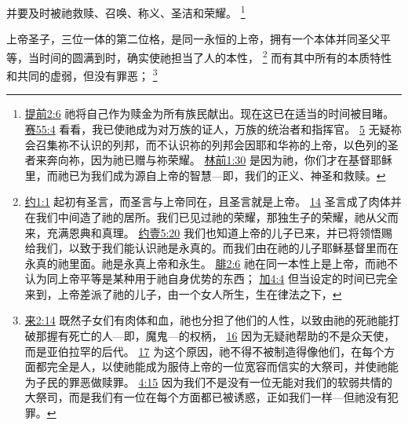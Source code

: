 \documentclass[12pt, a4paper, oneside]{ctexart}
\newcounter{parnum}[section]
\newcommand{\N}{%
   \noindent\refstepcounter{parnum}%
    \makebox[\parindent][l]{\textbf{\arabic{parnum}.}}}
\begin{document}
	并要及时被祂救赎、召唤、称义、圣洁和荣耀。
	\footnote {
		\href{https://biblehub.com/1_timothy/2-6.htm}{提前2:6} 祂将自己作为赎金为所有族民献出。现在这已在适当的时间被目睹。
		\href{https://biblehub.com/isaiah/55-4.htm}{赛55:4} 看看，我已使祂成为对万族的证人，万族的统治者和指挥官。
        \href{https://biblehub.com/isaiah/55-5.htm}{5} 无疑祢会召集祢不认识的列邦，而不认识祢的列邦会因耶和华祢的上帝，以色列的圣者来奔向祢，因为祂已赠与祢荣耀。
		\href{https://biblehub.com/1_corinthians/1-30.htm}{林前1:30} 是因为祂，你们才在基督耶稣里，而祂已为我们成为源自上帝的智慧---即，我们的正义、神圣和救赎。
	}

\N 上帝圣子，三位一体的第二位格，是同一永恒的上帝，拥有一个本体并同圣父平等，当时间的圆满到时，确实使祂担当了人的本性，
	\footnote {
		\href{https://biblehub.com/john/1-1.htm}{约1:1} 起初有圣言，而圣言与上帝同在，且圣言就是上帝。
		\href{https://biblehub.com/john/1-14.htm}{14} 圣言成了肉体并在我们中间造了祂的居所。我们已见过祂的荣耀，那独生子的荣耀，祂从父而来，充满恩典和真理。
		\href{https://biblehub.com/1_john/5-20.htm}{约壹5:20} 我们也知道上帝的儿子已来，并已将领悟赐给我们，以致于我们能认识祂是永真的。而我们由在祂的儿子耶稣基督里而在永真的祂里面。祂是永真上帝和永生。
		\href{https://biblehub.com/philippians/2-6.htm}{腓2:6} 祂在同一本性上是上帝，而祂不认为同上帝平等是某种用于祂自身优势的东西；
		\href{https://biblehub.com/galatians/4-4.htm}{加4:4} 但当设定的时间已完全来到，上帝差派了祂的儿子，由一个女人所生，生在律法之下，
	}
	而有其中所有的本质特性和共同的虚弱，但没有罪恶；
	\footnote {
		\href{https://biblehub.com/hebrews/2-14.htm}{来2:14} 既然子女们有肉体和血，祂也分担了他们的人性，以致由祂的死祂能打破那握有死亡的人---即，魔鬼---的权柄，
		\href{https://biblehub.com/hebrews/2-16.htm}{16} 因为无疑祂帮助的不是众天使，而是亚伯拉罕的后代。
		\href{https://biblehub.com/hebrews/2-17.htm}{17} 为这个原因，祂不得不被制造得像他们，在每个方面都完全是人，以使祂能成为服侍上帝的一位宽容而信实的大祭司，并使祂能为子民的罪恶做赎罪。
		\href{https://biblehub.com/hebrews/4-15.htm}{4:15} 因为我们不是没有一位无能对我们的软弱共情的大祭司，而是我们有一位在每个方面都已被诱惑，正如我们一样---但祂没有犯罪。
	}
\end{document}
